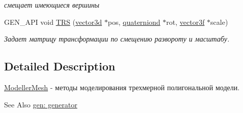 \begin{DoxyCompactItemize}
\begin{DoxyCompactList}\small\item\em смещает имеющиеся вершины \end{DoxyCompactList}\item 
\hypertarget{classgen_1_1_modeller_mesh_ab385e4d790caf0d2d75abe509414a282}{G\-E\-N\-\_\-\-A\-P\-I void \hyperlink{classgen_1_1_modeller_mesh_ab385e4d790caf0d2d75abe509414a282}{T\-R\-S} (\hyperlink{classbt_1_1vector3d}{vector3d} $\ast$pos, \hyperlink{classbt_1_1quaterniond}{quaterniond} $\ast$rot, \hyperlink{classbt_1_1vector3f}{vector3f} $\ast$scale)}\label{classgen_1_1_modeller_mesh_ab385e4d790caf0d2d75abe509414a282}

\begin{DoxyCompactList}\small\item\em Задает матрицу трансформации по смещению развороту и масштабу. \end{DoxyCompactList}\end{DoxyCompactItemize}


\subsection{Detailed Description}
\hyperlink{classgen_1_1_modeller_mesh}{Modeller\-Mesh} -\/ методы моделирования трехмерной полигональной модели. 

\begin{DoxySeeAlso}{See Also}
\hyperlink{group__generator}{gen\-: generator} 
\end{DoxySeeAlso}


